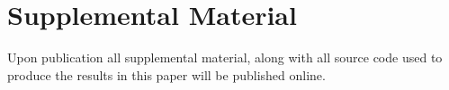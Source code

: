 \newpage
\section{Supplemental Material}
Upon publication all supplemental material, along with all source code used to produce the results in this paper will be published online.